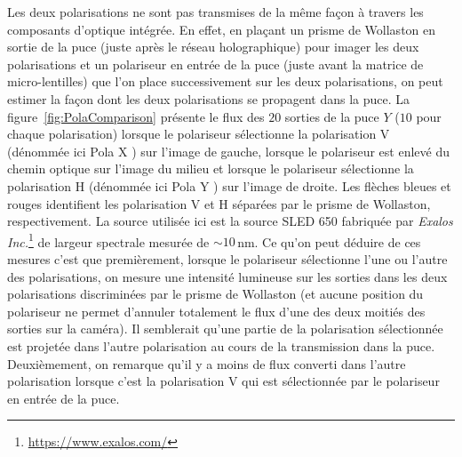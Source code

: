 Les deux polarisations ne sont pas transmises de la même façon à travers les composants d'optique intégrée. En effet, en plaçant un prisme de Wollaston en sortie de la puce (juste après le réseau holographique) pour imager les deux polarisations et un polariseur en entrée de la puce (juste avant la matrice de micro-lentilles) que l'on place successivement sur les deux polarisations, on peut estimer la façon dont les deux polarisations se propagent dans la puce. La figure~\ref{fig:PolaComparison} présente le flux des $20$ sorties de la puce $Y$ ($10$ pour chaque polarisation) lorsque le polariseur sélectionne la polarisation V (dénommée ici \og Pola X \fg) sur l'image de gauche, lorsque le polariseur est enlevé du chemin optique sur l'image du milieu et lorsque le polariseur sélectionne la polarisation H (dénommée ici \og Pola Y \fg) sur l'image de droite. Les flèches bleues et rouges identifient les polarisation V et H séparées par le prisme de Wollaston, respectivement. La source utilisée ici est la source SLED 650 fabriquée par \textit{Exalos Inc.}\footnote{\url{https://www.exalos.com/}} de largeur spectrale mesurée de $\sim 10 \,$nm. Ce qu'on peut déduire de ces mesures c'est que premièrement, lorsque le polariseur sélectionne l'une ou l'autre des polarisations, on mesure une intensité lumineuse sur les sorties dans les deux polarisations discriminées par le prisme de Wollaston (et aucune position du polariseur ne permet d'annuler totalement le flux d'une des deux moitiés des sorties sur la caméra). Il semblerait qu'une partie de la polarisation sélectionnée est projetée dans l'autre polarisation au cours de la transmission dans la puce. Deuxièmement, on remarque qu'il y a moins de flux converti dans l'autre polarisation lorsque c'est la polarisation V qui est sélectionnée par le polariseur en entrée de la puce.

